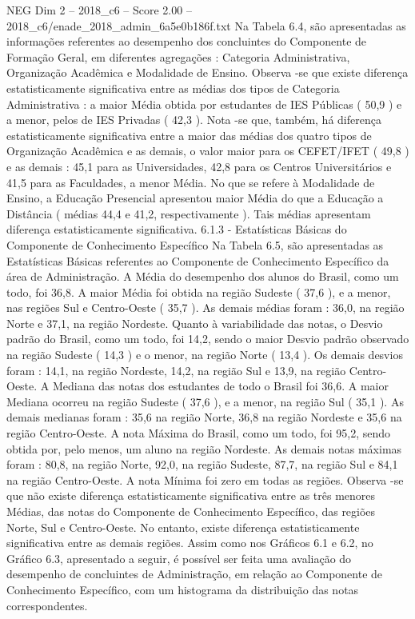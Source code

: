 \begin{textsample}{NEG Dim 2 – 2018\_c6 – Score 2.00 – 2018\_c6/enade\_2018\_admin\_6a5e0b186f.txt}
Na Tabela 6.4, são apresentadas as informações referentes ao desempenho dos concluintes do Componente de Formação Geral, em diferentes agregações : Categoria Administrativa, Organização Acadêmica e Modalidade de Ensino.
Observa -se que existe diferença estatisticamente significativa entre as médias dos tipos de Categoria Administrativa : a maior Média obtida por estudantes de IES Públicas ( 50,9 ) e a menor, pelos de IES Privadas ( 42,3 ).
Nota -se que, também, há diferença estatisticamente significativa entre a maior das médias dos quatro tipos de Organização Acadêmica e as demais, o valor maior para os CEFET/IFET ( 49,8 ) e as demais : 45,1 para as Universidades, 42,8 para os Centros Universitários e 41,5 para as Faculdades, a menor Média.
No que se refere à Modalidade de Ensino, a Educação Presencial apresentou maior Média do que a Educação a Distância ( médias 44,4 e 41,2, respectivamente ).
Tais médias apresentam diferença estatisticamente significativa. 6.1.3 - Estatísticas Básicas do Componente de Conhecimento Específico Na Tabela 6.5, são apresentadas as Estatísticas Básicas referentes ao Componente de Conhecimento Específico da área de Administração.
A Média do desempenho dos alunos do Brasil, como um todo, foi 36,8.
A maior Média foi obtida na região Sudeste ( 37,6 ), e a menor, nas regiões Sul e Centro-Oeste ( 35,7 ).
As demais médias foram : 36,0, na região Norte e 37,1, na região Nordeste.
Quanto à variabilidade das notas, o Desvio padrão do Brasil, como um todo, foi 14,2, sendo o maior Desvio padrão observado na região Sudeste ( 14,3 ) e o menor, na região Norte ( 13,4 ).
Os demais desvios foram : 14,1, na região Nordeste, 14,2, na região Sul e 13,9, na região Centro-Oeste.
A Mediana das notas dos estudantes de todo o Brasil foi 36,6.
A maior Mediana ocorreu na região Sudeste ( 37,6 ), e a menor, na região Sul ( 35,1 ).
As demais medianas foram : 35,6 na região Norte, 36,8 na região Nordeste e 35,6 na região Centro-Oeste.
A nota Máxima do Brasil, como um todo, foi 95,2, sendo obtida por, pelo menos, um aluno na região Nordeste.
As demais notas máximas foram : 80,8, na região Norte, 92,0, na região Sudeste, 87,7, na região Sul e 84,1 na região Centro-Oeste.
A nota Mínima foi zero em todas as regiões.
Observa -se que não existe diferença estatisticamente significativa entre as três menores Médias, das notas do Componente de Conhecimento Específico, das regiões Norte, Sul e Centro-Oeste.
No entanto, existe diferença estatisticamente significativa entre as demais regiões.
Assim como nos Gráficos 6.1 e 6.2, no Gráfico 6.3, apresentado a seguir, é possível ser feita uma avaliação do desempenho de concluintes de Administração, em relação ao Componente de Conhecimento Específico, com um histograma da distribuição das notas correspondentes.

\end{textsample}
